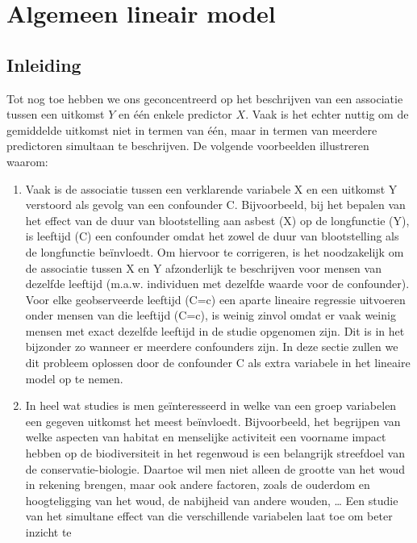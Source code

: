 \documentclass[12pt,dutch,coursenotes]{book}
\theoremstyle{definition}
\theoremstyle{definition}
\theoremstyle{definition}
\theoremstyle{remark}
\begin{document}
\chapter{Algemeen lineair model}\label{chap:glm}

\section{Inleiding}\label{inleiding-8}

Tot nog toe hebben we ons geconcentreerd op het beschrijven van een
associatie tussen een uitkomst \(Y\) en één enkele predictor \(X\). Vaak
is het echter nuttig om de gemiddelde uitkomst niet in termen van één,
maar in termen van meerdere predictoren simultaan te beschrijven. De
volgende voorbeelden illustreren waarom:

\begin{enumerate}
\def\labelenumi{\arabic{enumi}.}
\item
  Vaak is de associatie tussen een verklarende variabele X en een
  uitkomst Y verstoord als gevolg van een confounder C. Bijvoorbeeld,
  bij het bepalen van het effect van de duur van blootstelling aan
  asbest (X) op de longfunctie (Y), is leeftijd (C) een confounder omdat
  het zowel de duur van blootstelling als de longfunctie beïnvloedt. Om
  hiervoor te corrigeren, is het noodzakelijk om de associatie tussen X
  en Y afzonderlijk te beschrijven voor mensen van dezelfde leeftijd
  (m.a.w. individuen met dezelfde waarde voor de confounder). Voor elke
  geobserveerde leeftijd (C=c) een aparte lineaire regressie uitvoeren
  onder mensen van die leeftijd (C=c), is weinig zinvol omdat er vaak
  weinig mensen met exact dezelfde leeftijd in de studie opgenomen zijn.
  Dit is in het bijzonder zo wanneer er meerdere confounders zijn. In
  deze sectie zullen we dit probleem oplossen door de confounder C als
  extra variabele in het lineaire model op te nemen.
\item
  In heel wat studies is men geïnteresseerd in welke van een groep
  variabelen een gegeven uitkomst het meest beïnvloedt. Bijvoorbeeld,
  het begrijpen van welke aspecten van habitat en menselijke activiteit
  een voorname impact hebben op de biodiversiteit in het regenwoud is
  een belangrijk streefdoel van de conservatie-biologie. Daartoe wil men
  niet alleen de grootte van het woud in rekening brengen, maar ook
  andere factoren, zoals de ouderdom en hoogteligging van het woud, de
  nabijheid van andere wouden, \ldots{} Een studie van het simultane
  effect van die verschillende variabelen laat toe om beter inzicht te

\end{enumerate}
\end{document}

